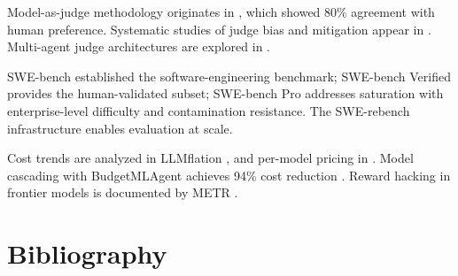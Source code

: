 \documentclass[11pt]{book}
\begin{document}
Model-as-judge methodology originates in \cite{llmasjudge2023}, which showed 80\% agreement with human preference. Systematic studies of judge bias and mitigation appear in \cite{llmasjudge2025}. Multi-agent judge architectures are explored in \cite{multiagentjudge2025}.

SWE-bench \cite{swebench2024} established the software-engineering benchmark; SWE-bench Verified provides the human-validated subset; SWE-bench Pro \cite{swebenchpro2025} addresses saturation with enterprise-level difficulty and contamination resistance. The SWE-rebench infrastructure \cite{swebenchinfra2025} enables evaluation at scale.

Cost trends are analyzed in LLMflation \cite{llmflation2024}, and per-model pricing in \cite{llmpricing2025}. Model cascading with BudgetMLAgent achieves 94\% cost reduction \cite{budgetmlagent2024}. Reward hacking in frontier models is documented by METR \cite{metr2025}.

\section*{Bibliography}
\end{document}
